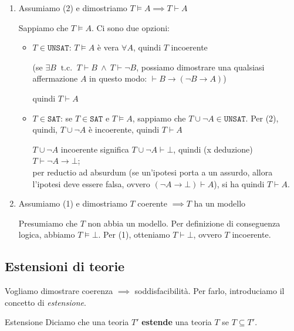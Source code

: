\documentclass[a4paper,11pt]{report}
\newcommand{\SAT}{\texttt{SAT}}
\newcommand{\UNSAT}{\texttt{UNSAT}}
\begin{document}
\begin{proofframe}
\begin{enumerate}
    \item Assumiamo {\color{purple}(2)} e dimostriamo \( T \vDash A \implies T \vdash A \) 

    Sappiamo che \( T \vDash A \). Ci sono due opzioni:
    \begin{itemize}
        \item \( T \in \UNSAT \): \( T\vDash A \) è vera \( \forall A \), quindi \( T \) incoerente 

            \subitem(se \( \exists B \ \text{ t.c. } \ T\vdash B \ \land \ T \vdash \neg B \), possiamo dimostrare una qualsiasi affermazione \( A \) in questo modo: \( \vdash B\to(\neg B \to A) \))

            quindi \( T \vdash A \)

        \item \( T \in \texttt{SAT} \): se \( T\in \SAT \) e \( T\vDash A \), sappiamo che \( T \cup \neg A \in \UNSAT \). 
            \subitem Per {\color{purple}(2)}, quindi, \( T \cup \neg A \) è incoerente, quindi \( T \vdash A \)

            {\color{CadetBlue}\( T\cup \neg A  \) incoerente significa \( T \cup \neg A \vdash \bot\), quindi (x deduzione) \( T \vdash \neg A \to \bot \); \\
            per reductio ad absurdum {\small(se un'ipotesi porta a un assurdo, allora l'ipotesi deve essere falsa, ovvero \((\neg A \to \bot) \vdash A \))}, si ha quindi \( T \vdash A \).}
    \end{itemize}

\item Assumiamo {\color{blue}(1)} e dimostriamo \( T \) coerente \(\implies T \) ha un modello

    Presumiamo che \( T \) non abbia un modello. Per definizione di conseguenza logica, abbiamo \( T\vDash \bot \). Per {\color{blue}(1)}, otteniamo \( T\vdash \bot \), ovvero \( T \) incoerente.
\end{enumerate}
\end{proofframe}

\subsection{Estensioni di teorie}
Vogliamo dimostrare coerenza \( \implies \) soddisfacibilità. Per farlo, introduciamo il concetto di \textit{estensione}.

\begin{defframe}{Estensione}{}
    Diciamo che una teoria \( T' \) \textbf{estende} una teoria \( T \) se \( T \subseteq T' \).
\end{defframe}
\end{document}
